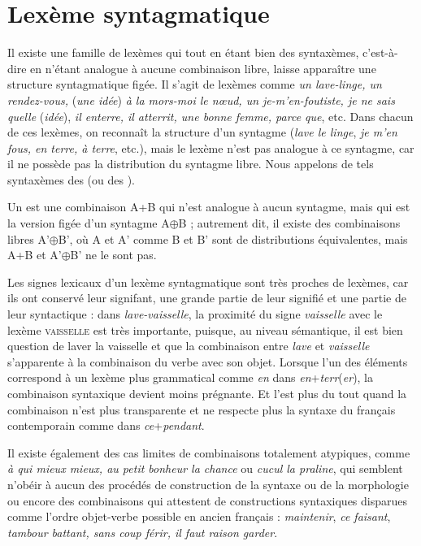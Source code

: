 \section{Lexème syntagmatique}\label{sec:3.1.12}

Il existe une famille de lexèmes qui tout en étant bien des syntaxèmes, c’est-à-dire en n’étant analogue à aucune combinaison libre, laisse apparaître une structure syntagmatique figée. Il s’agit de lexèmes comme \textit{un lave-linge, un rendez-vous,} (\textit{une idée}) \textit{à la mors-moi le nœud, un je-m’en-foutiste, je ne sais quelle} (\textit{idée}), \textit{il enterre, il atterrit, une bonne femme, parce que}, etc. Dans chacun de ces lexèmes, on reconnaît la structure d’un syntagme (\textit{lave le linge}, \textit{je m’en fous, en terre, à terre}, etc.), mais le lexème n’est pas analogue à ce syntagme, car il ne possède pas la distribution du syntagme libre. Nous appelons de tels syntaxèmes des  (ou des ).

{Un  est une combinaison A+B qui n’est analogue à aucun syntagme, mais qui est la version figée d’un syntagme A${\oplus}$B ; autrement dit, il existe des combinaisons libres A’${\oplus}$B’, où A et A’ comme B et B’ sont de distribu\-tions équivalentes, mais A+B et A’${\oplus}$B’ ne le sont pas.}

Les signes lexicaux d’un lexème syntagmatique sont très proches de lexèmes, car ils ont conservé leur signifant, une grande partie de leur signifié et une partie de leur syntactique : dans \textit{lave-vaisselle}, la proximité du signe \textit{vaisselle} avec le lexème \textsc{vaisselle} est très importante, puisque, au niveau sémantique, il est bien question de laver la vaisselle et que la combinaison entre \textit{lave} et \textit{vaisselle} s’apparente à la combinaison du verbe avec son objet. Lorsque l’un des éléments correspond à un lexème plus grammatical comme \textit{en} dans \textit{en}+\textit{terr}(\textit{er}), la combinaison syntaxique devient moins prégnante. Et l’est plus du tout quand la combinaison n’est plus transparente et ne respecte plus la syntaxe du français contemporain comme dans \textit{ce}+\textit{pendant}.

\begin{sloppypar}
Il existe également des cas limites de combinaisons totalement atypiques, comme \textit{à qui mieux mieux, au petit bonheur la chance} ou \textit{cucul la praline}, qui semblent n’obéir à aucun des procédés de construction de la syntaxe ou de la morphologie ou encore des combinaisons qui attestent de constructions syntaxiques disparues comme l’ordre objet-verbe possible en ancien français : \textit{maintenir}, \textit{ce faisant}, \textit{tambour battant, sans coup férir, il faut raison garder}.
\end{sloppypar}

